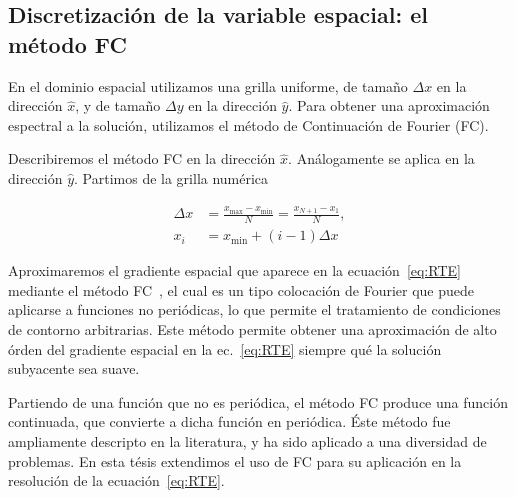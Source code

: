 \subsection{Discretización de la variable espacial: el método FC}
\label{sec:fcmethod}

En el dominio espacial utilizamos una grilla uniforme, 
de tamaño $\Delta x$ en la dirección $\hat x$, y
de tamaño $\Delta y$ en la dirección $\hat y$. 
Para obtener una aproximación espectral a la solución, 
utilizamos el método de Continuación de Fourier (FC). 

Describiremos el método FC en la dirección $\hat x$. 
Análogamente se aplica en la dirección $\hat y$. 
Partimos de la grilla numérica

\begin{equation*}
\begin{aligned}
\Delta x &=\frac{x_{\text{max}}-x_{\text{min}}}{N} = \frac{x_{N+1} - x_1}{N} ,\\
x_i &=x_{\mathrm{min}}+(i-1)\Delta x
\end{aligned}
\end{equation*} 

Aproximaremos el gradiente espacial que aparece 
en la ecuación~\eqref{eq:RTE} mediante el método FC~\cite{Albin2011,Gaggioli2019}, 
el cual es un tipo colocación de Fourier que 
puede aplicarse a funciones no periódicas, lo que permite 
el tratamiento de condiciones de contorno arbitrarias. 
Este método permite obtener una aproximación de alto 
órden del gradiente espacial en la ec.~\eqref{eq:RTE} 
siempre qué la solución subyacente sea suave.

Partiendo de una función que no es periódica, el método FC produce 
una función continuada, que convierte a dicha función en periódica. 
Éste método fue ampliamente descripto en la literatura, y ha sido aplicado 
a una diversidad de problemas. En esta tésis extendimos el uso de FC 
para su aplicación en la resolución de la ecuación~\eqref{eq:RTE}.

